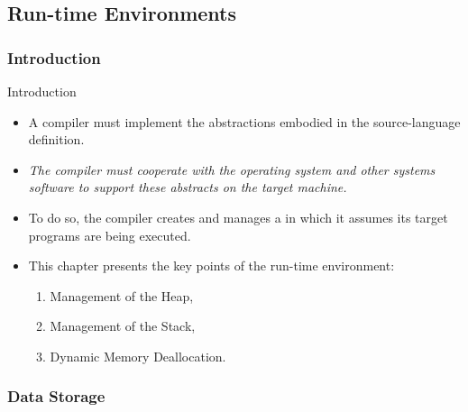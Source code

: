 \begin{bibunit}[apalike]

\part[author={Stéphane GALLAND},label={chap:runtime_environments}]{Run-time Environments}

\tableofcontentslide

\section{Introduction}

\begin{frame}{Introduction}
	\begin{itemize}
	\item A compiler must implement the abstractions embodied in the source-language definition.
	\vfill
	\item \emph{The compiler must cooperate with the operating system and other systems software to support these abstracts on the target machine.}
	\vfill
	\item To do so, the compiler creates and manages a  in which it assumes its target programs are being executed.
	\vfill
	\item \alert{This chapter presents the key points of the run-time environment:}
		\begin{enumerate}
		\item Management of the Heap,
		\item Management of the Stack,
		\item Dynamic Memory Deallocation.
		\end{enumerate}
	\end{itemize}
\end{frame}

\section{Data Storage}

\tableofcontentslide[sectionstyle={show/shaded},subsectionstyle={show/show/hide},subsubsectionstyle={hide/hide/hide/hide}]


\end{bibunit}
